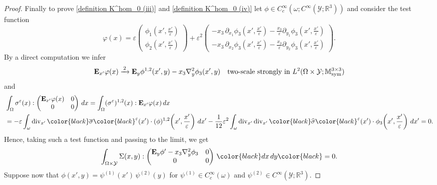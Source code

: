 \documentclass[reqno,10pt]{amsart}
\numberwithin{equation}{section}
\theoremstyle{remark}
\newcommand{\BLACK}{\color{black}}
\newcommand{\PINK}{\color{black}}
\newcommand{\M}{\mathbb{M}}
\newcommand{\R}{\mathbb{R}}
\newcommand{\calY}{\mathcal{Y}}
\DeclareMathOperator{\sym}{sym}
\newcommand{\strongtwoscale}{\xrightarrow{\,2\,}}
\renewcommand{\div}{\operatorname{div}}
\newcommand{\eps}{\varepsilon}
\newcommand{\zerothI}[1]{\overline{#1}}
\newcommand{\firstI}[1]{\widehat{#1}}
\newcommand{\E}{{\bf E}}
\newcommand{\D}{\nabla}
\begin{document}
\begin{proof}
Finally to prove \ref{definition K^hom_0 (iii)} and \ref{definition K^hom_0 (iv)} let $\phi \in C_c^{\infty}(\omega;C^{\infty}(\calY;\R^3))$ and consider the test function 
\begin{equation*}
	\varphi(x) 
	= \eps \!\left(\begin{array}{c} \phi_1(x',\frac{x'}{\eps}) \\ \phi_2(x',\frac{x'}{\eps}) \end{array}\right) 
	+ \eps^2 \!\left(\begin{array}{c} - x_3\,\partial_{x_1}\phi_3(x',\frac{x'}{\eps}) - \frac{x_3}{\eps}\partial_{y_1}\phi_3(x',\frac{x'}{\eps}) \\ - x_3\,\partial_{x_2}\phi_3(x',\frac{x'}{\eps}) - \frac{x_3}{\eps}\partial_{y_2}\phi_3(x',\frac{x'}{\eps}) \end{array}\right).
\end{equation*}
By a direct computation we infer
\begin{equation*}
	{\E}_{x'}\varphi(x) \strongtwoscale {\E}_{y}\phi^{1,2}(x',y) - x_3 {\D}^2_{y}\phi_3(x',y) \quad \text{two-scale strongly in } L^2(\Omega \times \calY;\M^{3 \times 3}_{\sym})
\end{equation*}
and
\begin{align*}
	& \int_{\Omega} \sigma^\eps(x) : \begin{pmatrix} {\E}_{x'}\varphi(x) & 0 \\ 0 & 0 \end{pmatrix} \,dx
	= \int_{\Omega} (\sigma^\eps)^{1,2}(x) : {\E}_{x'}\varphi(x) \,dx
	\\& = - \eps \int_{\omega} \div_{x'}{\PINK\zerothI{\sigma}\BLACK}^\eps(x') \cdot (\phi)^{1,2}\!\left(x',\frac{x'}{\eps}\right) \,dx' - \frac{1}{12} \eps^2 \int_{\omega} \div_{x'}\div_{x'}{\PINK\firstI{\sigma}\BLACK}^\eps(x') \cdot \phi_3\!\left(x',\frac{x'}{\eps}\right) \,dx'= 0.
\end{align*}
Hence, taking such a test function and passing to the limit, we get
\begin{equation*}
	\int_{\Omega \times \calY} \Sigma(x,y) : \begin{pmatrix} {\E}_{y}\phi' - x_3 {\D}^2_{y}\phi_3 & 0 \\ 0 & 0 \end{pmatrix} \,{\PINK dx\,dy\BLACK} = 0.
\end{equation*}
Suppose now that $\phi\!\left(x',y\right) = \psi^{(1)}(x')\,\psi^{(2)}(y)$ for $\psi^{(1)} \in C_c^{\infty}(\omega)$ and $\psi^{(2)} \in C^{\infty}(\calY;\R^3)$.

\end{proof}
\end{document}

